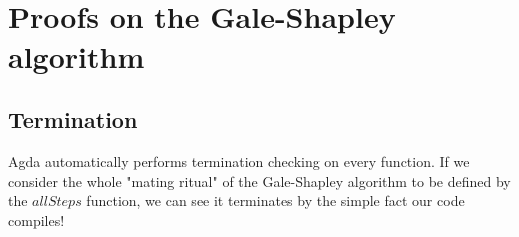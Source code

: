 {\begin{code}%
\>[0]\AgdaSpace{}%
\AgdaSymbol{:}\AgdaSpace{}%
\AgdaSymbol{(}\AgdaSpace{}%
\AgdaSymbol{:}\AgdaSpace{}%
\AgdaSymbol{)}\AgdaSpace{}%
\AgdaSpace{}%
\<%
\\
\>[0]\AgdaSpace{}%
\AgdaSymbol{(}\AgdaSpace{}%
\AgdaSpace{}%
\AgdaInductiveConstructor{[]}\AgdaSpace{}%
\AgdaSpace{}%
\AgdaSpace{}%
\AgdaSpace{}%
\AgdaSpace{}%
\AgdaSymbol{)}\AgdaSpace{}%
\AgdaSymbol{=}\AgdaSpace{}%
\AgdaSpace{}%
\AgdaSpace{}%
\AgdaInductiveConstructor{[]}\AgdaSpace{}%
\AgdaSpace{}%
\AgdaSpace{}%
\AgdaSpace{}%
\AgdaSpace{}%
\<%
\\
\>[0]\AgdaSpace{}%
\AgdaSymbol{(}\AgdaSpace{}%
\AgdaSpace{}%
\AgdaSymbol{(}\AgdaSpace{}%
\AgdaSpace{}%
\AgdaSymbol{)}\AgdaSpace{}%
\AgdaSpace{}%
\AgdaSpace{}%
\AgdaSpace{}%
\AgdaSpace{}%
\AgdaSymbol{)}\AgdaSpace{}%
\AgdaSymbol{=}\AgdaSpace{}%
\AgdaSpace{}%
\AgdaSymbol{(}\AgdaSpace{}%
\AgdaSpace{}%
\AgdaSymbol{(}\AgdaSpace{}%
\AgdaSpace{}%
\AgdaSymbol{)}\AgdaSpace{}%
\AgdaSpace{}%
\AgdaSpace{}%
\AgdaSpace{}%
\AgdaSpace{}%
\AgdaSymbol{)}\<%
\end{code}

\section{Proofs on the Gale-Shapley algorithm}

\subsection{Termination}

Agda automatically performs termination checking on every function. If we consider the whole "mating ritual" \cite{Lehman2018MathematicsScience} of the Gale-Shapley algorithm to be defined by the $allSteps$ function, we can see it terminates by the simple fact our code compiles!

}
